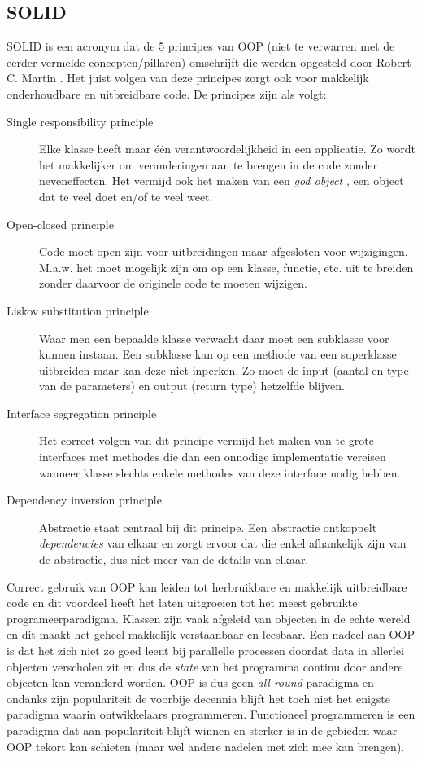 \subsection{SOLID}
SOLID is een acronym dat de 5 principes van OOP (niet te verwarren met de eerder vermelde concepten/pillaren) omschrijft die werden opgesteld door Robert C. Martin \autocite{Buysse2017-2018}.  Het juist volgen van deze principes zorgt ook voor makkelijk onderhoudbare en uitbreidbare code. De principes zijn als volgt:
\begin{description}
  \item [Single responsibility principle] Elke klasse heeft maar één verantwoordelijkheid in een applicatie. Zo wordt het makkelijker om veranderingen aan te brengen in de code zonder neveneffecten. Het vermijd ook het maken van een \textit{god object} \autocite{Riel1996}, een object dat te veel doet en/of te veel weet.
  \item [Open-closed principle] Code moet open zijn voor uitbreidingen maar afgesloten voor wijzigingen. M.a.w. het moet mogelijk zijn om op een klasse, functie, etc. uit te breiden zonder daarvoor de originele code te moeten wijzigen. 
  \item [Liskov substitution principle] Waar men een bepaalde klasse verwacht daar moet een subklasse voor kunnen instaan. Een subklasse kan op een methode van een superklasse uitbreiden maar kan deze niet inperken. Zo moet de input (aantal en type van de parameters) en output (return type) hetzelfde blijven.
  \item [Interface segregation principle] Het correct volgen van dit principe vermijd het maken van te grote interfaces met methodes die dan een onnodige implementatie vereisen wanneer klasse slechts enkele methodes van deze interface nodig hebben.
  \item [Dependency inversion principle] Abstractie staat centraal bij dit principe. Een abstractie ontkoppelt \textit{dependencies} van elkaar en zorgt ervoor dat die enkel afhankelijk zijn van de abstractie, dus niet meer van de details van elkaar.
\end{description}

Correct gebruik van OOP kan leiden tot herbruikbare en makkelijk uitbreidbare code en dit voordeel heeft het laten uitgroeien tot het meest gebruikte programeerparadigma. Klassen zijn vaak afgeleid van objecten in de echte wereld en dit maakt het geheel makkelijk verstaanbaar en leesbaar. Een nadeel aan OOP is dat het zich niet zo goed leent bij parallelle processen doordat data in allerlei objecten verscholen zit en dus de \textit{state} van het programma continu door andere objecten kan veranderd worden. OOP is dus geen \textit{all-round} paradigma en ondanks zijn populariteit de voorbije decennia blijft het toch niet het enigste paradigma waarin ontwikkelaars programmeren. Functioneel programmeren is een paradigma dat aan populariteit blijft winnen en sterker is in de gebieden waar OOP tekort kan schieten (maar wel andere nadelen met zich mee kan brengen).

